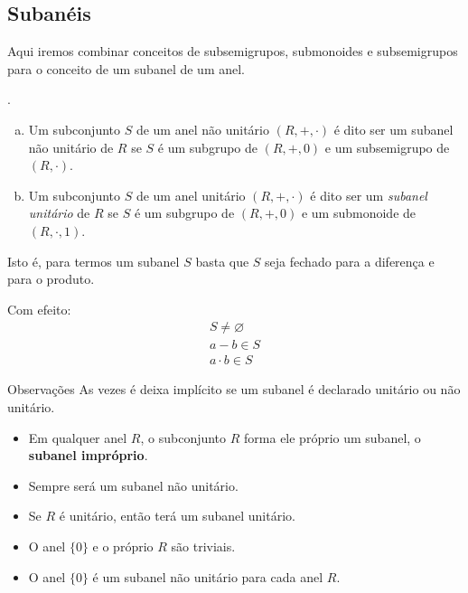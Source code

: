 \subsection{Subanéis}
Aqui iremos combinar conceitos de subsemigrupos, submonoides e subsemigrupos para o conceito de um subanel de um anel.
\begin{definition}.
  \begin{enumerate}[(a)]
    \item Um subconjunto $S$ de um anel não unitário $(R, +, \cdot)$ é dito ser um subanel não unitário de $R$ se $S$ é um subgrupo de $(R,+,0)$ e um subsemigrupo de $(R,\cdot)$.
    \item Um subconjunto $S$ de um anel unitário $(R, +, \cdot)$ é dito ser um \emph{subanel unitário} de $R$ se $S$ é um subgrupo de $(R,+,0)$ e um submonoide de $(R,\cdot , 1)$.
  \end{enumerate}
\end{definition}
Isto é, para termos um subanel $S$ basta que $S$ seja fechado para a diferença e para o produto. 

Com efeito:
\begin{align*}
  S \neq \varnothing\\
  a-b \in S\\
  a\cdot b \in S
\end{align*}

\begin{mymdframed}{Observações}
  As vezes é deixa implícito se um subanel é declarado unitário ou não unitário.
  \begin{itemize}
    \item Em qualquer anel $R$, o subconjunto $R$ forma ele próprio um subanel, o \textbf{subanel impróprio}.
    \item Sempre será um subanel não unitário.
    \item Se $R$ é unitário, então terá um subanel unitário.
    \item O anel $\{0\}$ e o próprio $R$ são triviais. 
    \item O anel $\{0\}$ é um subanel não unitário para cada anel $R$.
  \end{itemize}
\end{mymdframed}


